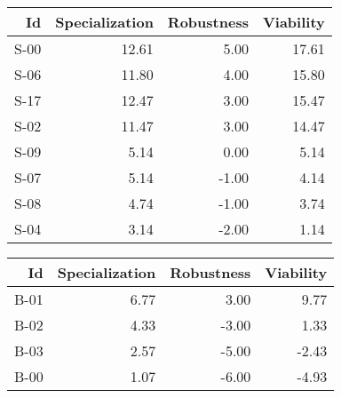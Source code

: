 

\begin{tabular}{ | r | r | r | r | }
    \hline
                    Id  &  Specialization  &      Robustness  &       Viability  \\
    \hline
    \hline
                  S-00  &           12.61  &            5.00  &           17.61  \\
    \hline
                  S-06  &           11.80  &            4.00  &           15.80  \\
    \hline
                  S-17  &           12.47  &            3.00  &           15.47  \\
    \hline
                  S-02  &           11.47  &            3.00  &           14.47  \\
    \hline
                  S-09  &            5.14  &            0.00  &            5.14  \\
    \hline
                  S-07  &            5.14  &           -1.00  &            4.14  \\
    \hline
                  S-08  &            4.74  &           -1.00  &            3.74  \\
    \hline
                  S-04  &            3.14  &           -2.00  &            1.14  \\
    \hline
\end{tabular}


\begin{tabular}{ | r | r | r | r | }
    \hline
                    Id  &  Specialization  &      Robustness  &       Viability  \\
    \hline
    \hline
                  B-01  &            6.77  &            3.00  &            9.77  \\
    \hline
                  B-02  &            4.33  &           -3.00  &            1.33  \\
    \hline
                  B-03  &            2.57  &           -5.00  &           -2.43  \\
    \hline
                  B-00  &            1.07  &           -6.00  &           -4.93  \\
    \hline
\end{tabular}


